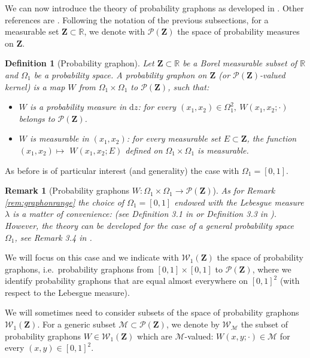 \documentclass[12pt,twoside,a4paper]{article}
\newtheorem{definition}[theorem]{Definition}
\newtheorem{remark}[theorem]{Remark}
\def\R{\mathbb{R}}
\newcommand{\cM}{{\mathcal M}}  %
\newcommand{\cP}{{\mathcal P}}  %
\newcommand{\cW}{{\mathcal W}}  %
\newcommand{\Space}{\mathbf{Z}}
\newcommand{\Graphon}{\mathcal{W}_1}
\begin{document}
We can now introduce the theory of probability graphons as developed in \cite{abraham2023probabilitygraphons}. Other references are \cite{zucal2024probabilitygraphonsrightconvergence,KUNSZENTIKOVACS2022109284,lovász2010limits,rath2011multigraph}.
Following the notation of the previous subsections, for a measurable set $\Space\subset \R$, we denote with $\mathcal{P}(\Space)$ the space of probability measures on $\Space$.


\begin{definition}[Probability graphon]\label{DefProbGraphon}
Let $\Space\subset \R$ be a Borel measurable subset of $\R$ and $\Omega_1$ be a probability space. A \emph{probability graphon} on $\Space$ (or $\mathcal{P}(\Space)$-valued kernel) is a map $W$ from $\Omega_1\times \Omega_1$ to $\mathcal{P}(\Space)$, such that:
\begin{itemize}
    \item $ W$ is a probability measure in $\mathrm{d} z$: for every $(x_1, x_2) \in \Omega_1^2, \ W(x_1, x_2 ; \cdot)$ belongs to $\mathcal{P}(\Space)$.
    \item $ W$ is measurable in $(x_1, x_2)$: for every measurable set $E \subset \Space$, the function $(x_1, x_2) \mapsto$ $ W(x_1, x_2 ; E)$ defined on $\Omega_1\times \Omega_1$ is measurable.
\end{itemize} 
\end{definition}
As before is of particular interest (and generality) the case with $\Omega_1=[0,1]$.  

\begin{remark}[Probability graphons $ W : \Omega_1\times \Omega_1 \to \cP(\Space)$]As for Remark \ref{rem:graphonrange} the choice of $\Omega_1=[0,1]$ endowed with the Lebesgue measure $\lambda$ is a matter of convenience: (see Definition 3.1 in \cite{abraham2023probabilitygraphons} or Definition 3.3 in \cite{zucal2024probabilitygraphonsrightconvergence}). However, the theory can be developed for the case of a general probability space $\Omega_1$, see Remark 3.4 in \cite{abraham2023probabilitygraphons}. 
\end{remark}

We will focus on this case and we indicate with $\Graphon(\Space)$ the space of probability graphons, i.e.\ probability graphons from $[0,1]\times [0,1]$ to $\mathcal{P}(\Space)$, where we identify probability graphons that are  equal almost everywhere on $[0,1]^2$ (with respect to the Lebesgue measure). 

We will sometimes need to consider subsets of the space of probability graphons $\Graphon(\Space)$. For a generic subset $\cM\subset \cP(\Space)$, we  denote  by $\cW  _\cM$  the subset  of probability graphons  $W\in  \Graphon(\Space)$  which are  $\cM$-valued: $W(x,y; \cdot)\in \cM$ for every $(x,y)\in [0, 1]^2$.
\end{document}
